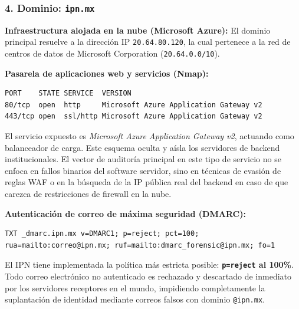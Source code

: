 \subsubsection*{4. Dominio: \texttt{ipn.mx}}

\begin{itemizeColor}
    \item \textbf{Infraestructura alojada en la nube (Microsoft Azure):}
    El dominio principal resuelve a la dirección IP \texttt{20.64.80.120}, la cual pertenece a la red de centros de datos de Microsoft Corporation (\texttt{20.64.0.0/10}).

    \item \textbf{Pasarela de aplicaciones web y servicios (Nmap):}
\begin{lstlisting}
PORT    STATE SERVICE  VERSION
80/tcp  open  http     Microsoft Azure Application Gateway v2
443/tcp open  ssl/http Microsoft Azure Application Gateway v2
\end{lstlisting}
    El servicio expuesto es \textit{Microsoft Azure Application Gateway v2}, actuando como balanceador de carga. Este esquema oculta y aísla los servidores de backend institucionales. El vector de auditoría principal en este tipo de servicio no se enfoca en fallos binarios del software servidor, sino en técnicas de evasión de reglas WAF o en la búsqueda de la IP pública real del backend en caso de que carezca de restricciones de firewall en la nube.

    \item \textbf{Autenticación de correo de máxima seguridad (DMARC):}
\begin{lstlisting}
TXT _dmarc.ipn.mx v=DMARC1; p=reject; pct=100; rua=mailto:correo@ipn.mx; ruf=mailto:dmarc_forensic@ipn.mx; fo=1
\end{lstlisting}
    El IPN tiene implementada la política más estricta posible: \textbf{\texttt{p=reject} al 100\%}. Todo correo electrónico no autenticado es rechazado y descartado de inmediato por los servidores receptores en el mundo, impidiendo completamente la suplantación de identidad mediante correos falsos con dominio \texttt{@ipn.mx}.


\end{itemizeColor}
